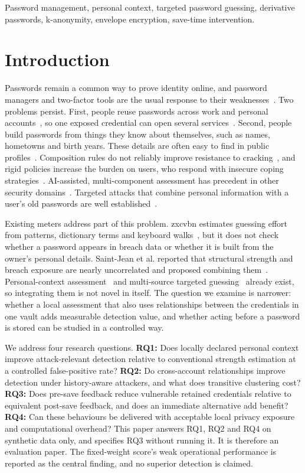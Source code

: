 \documentclass[conference]{IEEEtran}
\begin{document}
\begin{IEEEkeywords}
Password management, personal context, targeted password guessing, derivative passwords, k-anonymity, envelope encryption, save-time intervention.
\end{IEEEkeywords}

\section{Introduction}
Passwords remain a common way to prove identity online, and password managers and two-factor tools are the usual response to their weaknesses~\cite{jubur}. Two problems persist. First, people reuse passwords across work and personal accounts~\cite{aiswarya}, so one exposed credential can open several services~\cite{farcasin}. Second, people build passwords from things they know about themselves, such as names, hometowns and birth years. These details are often easy to find in public profiles~\cite{atzori2024}. Composition rules do not reliably improve resistance to cracking~\cite{he}, and rigid policies increase the burden on users, who respond with insecure coping strategies~\cite{umejiaku2023}. AI-assisted, multi-component assessment has precedent in other security domains~\cite{nebbione}. Targeted attacks that combine personal information with a user's old passwords are well established~\cite{ou2026,mdiguess}.

Existing meters address part of this problem. zxcvbn estimates guessing effort from patterns, dictionary terms and keyboard walks~\cite{wheeler}, but it does not check whether a password appears in breach data or whether it is built from the owner's personal details. Saint-Jean et al. reported that structural strength and breach exposure are nearly uncorrelated and proposed combining them~\cite{saintjean}. Personal-context assessment~\cite{atzori2024,alatawi} and multi-source targeted guessing~\cite{mdiguess} already exist, so integrating them is not novel in itself. The question we examine is narrower: whether a local assessment that also uses relationships between the credentials in one vault adds measurable detection value, and whether acting before a password is stored can be studied in a controlled way.

We address four research questions. \textbf{RQ1:} Does locally declared personal context improve attack-relevant detection relative to conventional strength estimation at a controlled false-positive rate? \textbf{RQ2:} Do cross-account relationships improve detection under history-aware attackers, and what does transitive clustering cost? \textbf{RQ3:} Does pre-save feedback reduce vulnerable retained credentials relative to equivalent post-save feedback, and does an immediate alternative add benefit? \textbf{RQ4:} Can these behaviours be delivered with acceptable local privacy exposure and computational overhead? This paper answers RQ1, RQ2 and RQ4 on synthetic data only, and specifies RQ3 without running it. It is therefore an evaluation paper. The fixed-weight score's weak operational performance is reported as the central finding, and no superior detection is claimed.
\end{document}
